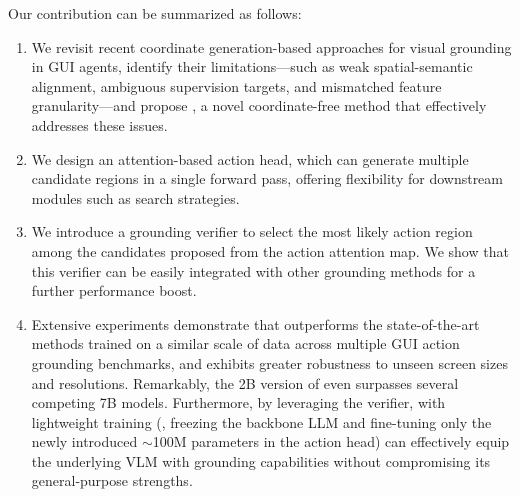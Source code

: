 Our contribution can be summarized as follows:
\begin{enumerate}[leftmargin=*, label=\arabic*.]
    \item We revisit recent coordinate generation-based approaches for visual grounding in GUI agents, identify their limitations—such as weak spatial-semantic alignment, ambiguous supervision targets, and mismatched feature granularity—and propose \sys, a novel coordinate-free method that effectively addresses these issues.
    \item We design an attention-based action head, which can generate multiple candidate regions in a single forward pass, offering flexibility for downstream modules such as search strategies.
    \item We introduce a grounding verifier to select the most likely action region among the candidates proposed from the action attention map. We show that this verifier can be easily integrated with other grounding methods for a further performance boost.
    \item Extensive experiments demonstrate that \sys outperforms the state-of-the-art methods trained on a similar scale of data across multiple GUI action grounding benchmarks, and exhibits greater robustness to unseen screen sizes and resolutions. Remarkably, the 2B version of \sys even surpasses several competing 7B models. Furthermore, by leveraging the verifier, \sys with lightweight training (\ie, freezing the backbone LLM and fine-tuning only the newly introduced $\sim$100M parameters in the action head) can effectively equip the underlying VLM with grounding capabilities without compromising its general-purpose strengths.
\end{enumerate}

